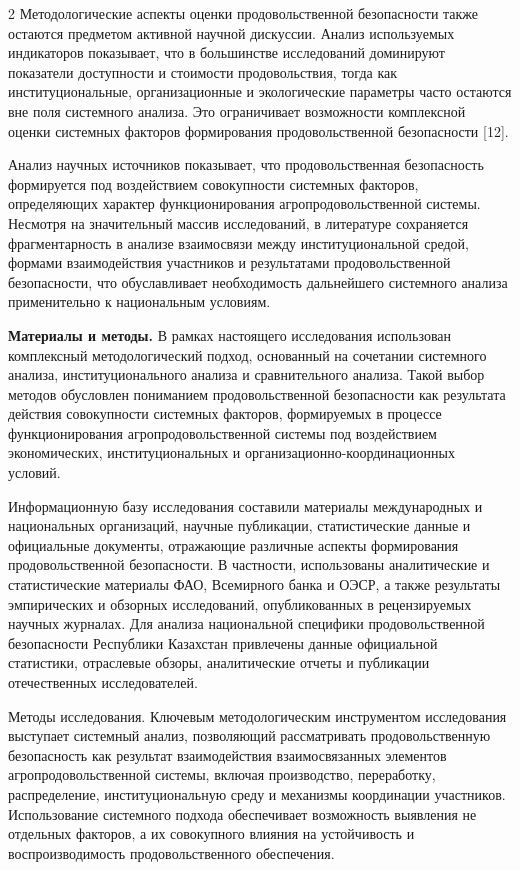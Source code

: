 \begin{multicols}{2}
Методологические аспекты оценки продовольственной безопасности также
остаются предметом активной научной дискуссии. Анализ используемых
индикаторов показывает, что в большинстве исследований доминируют
показатели доступности и стоимости продовольствия, тогда как
институциональные, организационные и экологические параметры часто
остаются вне поля системного анализа. Это ограничивает возможности
комплексной оценки системных факторов формирования продовольственной
безопасности {[}12{]}.

Анализ научных источников показывает, что продовольственная безопасность
формируется под воздействием совокупности системных факторов,
определяющих характер функционирования агропродовольственной системы.
Несмотря на значительный массив исследований, в литературе сохраняется
фрагментарность в анализе взаимосвязи между институциональной средой,
формами взаимодействия участников и результатами продовольственной
безопасности, что обуславливает необходимость дальнейшего системного
анализа применительно к национальным условиям.

{\bfseries Материалы и методы.} В рамках настоящего исследования
использован комплексный методологический подход, основанный на сочетании
системного анализа, институционального анализа и сравнительного анализа.
Такой выбор методов обусловлен пониманием продовольственной безопасности
как результата действия совокупности системных факторов, формируемых в
процессе функционирования агропродовольственной системы под воздействием
экономических, институциональных и организационно-координационных
условий.

Информационную базу исследования составили материалы международных и
национальных организаций, научные публикации, статистические данные и
официальные документы, отражающие различные аспекты формирования
продовольственной безопасности. В частности, использованы аналитические
и статистические материалы ФАО, Всемирного банка и ОЭСР, а также
результаты эмпирических и обзорных исследований, опубликованных в
рецензируемых научных журналах. Для анализа национальной специфики
продовольственной безопасности Республики Казахстан привлечены данные
официальной статистики, отраслевые обзоры, аналитические отчеты и
публикации отечественных исследователей.

Методы исследования. Ключевым методологическим инструментом исследования
выступает системный анализ, позволяющий рассматривать продовольственную
безопасность как результат взаимодействия взаимосвязанных элементов
агропродовольственной системы, включая производство, переработку,
распределение, институциональную среду и механизмы координации
участников. Использование системного подхода обеспечивает возможность
выявления не отдельных факторов, а их совокупного влияния на
устойчивость и воспроизводимость продовольственного обеспечения.


\end{multicols}
